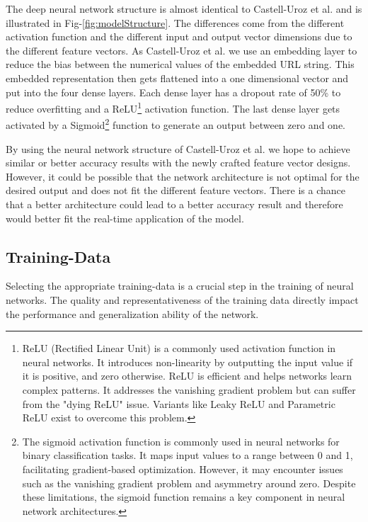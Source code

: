The deep neural network structure is almost identical to Castell-Uroz et al. \cite{castell2020url} and is illustrated in Fig-\ref{fig:modelStructure}.
The differences come from the different activation
function and the different input and output vector dimensions due to the different feature vectors. As Castell-Uroz et al. we use an embedding layer to reduce the bias between the numerical values of the embedded URL string. This embedded 
representation then gets flattened into a one dimensional vector and put into the four dense layers. Each dense layer has a dropout rate of 50\% to reduce
overfitting and a ReLU\footnote{ReLU (Rectified Linear Unit) is a commonly used activation function in neural networks. It 
introduces non-linearity by outputting the input value if it is positive, and zero otherwise. ReLU is efficient and helps
networks learn complex patterns. It addresses the vanishing gradient problem but can suffer from the "dying ReLU" issue. Variants
like Leaky ReLU and Parametric ReLU exist to overcome this problem.} activation function. The last dense layer gets activated
by a Sigmoid\footnote{The sigmoid activation function is commonly used in neural networks for binary classification tasks. It maps input values to a range between 0 and 1, facilitating gradient-based optimization. However, it may encounter issues such as the vanishing gradient problem and asymmetry around zero. Despite these limitations, the sigmoid function remains a key component in neural network architectures.} function to generate an output
between zero and one.

By using the neural network structure of Castell-Uroz et al. we hope to achieve similar or better accuracy results with 
the newly crafted feature vector designs. However, it could be possible that the network architecture is not optimal
for the desired output and does not fit the different feature vectors. There is a chance that a better architecture could 
lead to a better accuracy result and therefore would better fit the real-time application of the model.

\subsection{Training-Data}

Selecting the appropriate training-data is a crucial step in the training of neural networks. The quality and representativeness 
of the training data directly impact the performance and generalization ability of the network.

